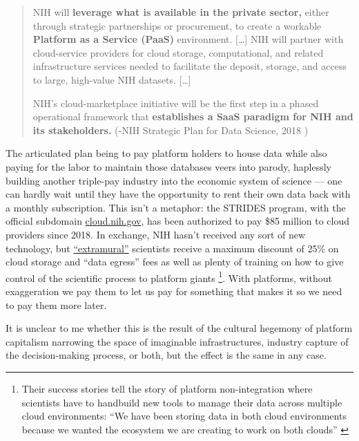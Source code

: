 \documentclass[notoc]{tufte-book}
\begin{document}
\begin{quote}
NIH will \textbf{leverage what is available in the private sector,}
either through strategic partnerships or procurement, to create a
workable \textbf{Platform as a Service (PaaS)} environment. {[}\ldots{]}
NIH will partner with cloud-service providers for cloud storage,
computational, and related infrastructure services needed to facilitate
the deposit, storage, and access to large, high-value NIH datasets.
{[}\ldots{]}

NIH's cloud-marketplace initiative will be the first step in a phased
operational framework that \textbf{establishes a SaaS paradigm for NIH
and its stakeholders.} (-NIH Strategic Plan for Data Science, 2018 \citep{NIHStrategicPlan2018} )
\end{quote}

The articulated plan being to pay platform holders to house data while
also paying for the labor to maintain those databases veers into parody,
haplessly building another triple-pay industry \citep{buranyiStaggeringlyProfitableBusiness2017}  into the economic system
of science --- one can hardly wait until they have the opportunity to
rent their own data back with a monthly subscription. This isn't a
metaphor: the STRIDES program, with the official subdomain
\href{https://web.archive.org/web/20210729131920/https://cloud.nih.gov/}{cloud.nih.gov},
has been authorized to pay \$85 million to cloud providers since 2018.
In exchange, NIH hasn't received any sort of new technology, but
\href{https://web.archive.org/web/20211006003547/https://cloud.nih.gov/enrollment/account-type/}{``extramural''}
scientists receive a maximum discount of 25\% on cloud storage and
``data egress'' fees as well as plenty of training on how to give
control of the scientific process to platform giants \citep{reillyNIHSTRIDESInitiative2021} \footnote{Their success stories tell
  the story of platform non-integration where scientists have to
  handbuild new tools to manage their data across multiple cloud
  environments: ``We have been storing data in both cloud environments
  because we wanted the ecosystem we are creating to work on both
  clouds'' \citep{STRIDESInitiativeSuccess2020} }. With platforms,
without exaggeration we pay them to let us pay for something that makes
it so we need to pay them more later.

It is unclear to me whether this is the result of the cultural hegemony
of platform capitalism narrowing the space of imaginable
infrastructures, industry capture of the decision-making process, or
both, but the effect is the same in any case.
\end{document}
